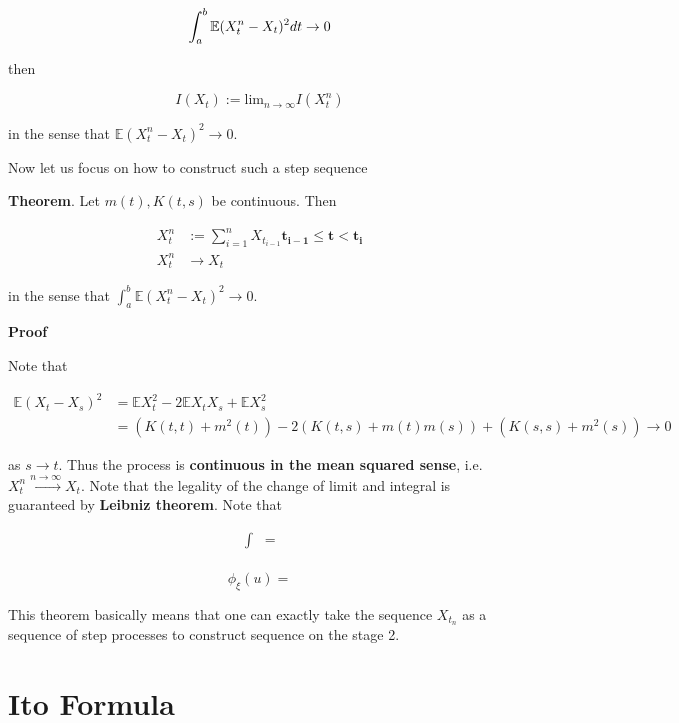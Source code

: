 \documentclass[12pt]{article}
\theoremstyle{nonumberbreak}
\begin{document}
$$
\int_a^b \mathbb{E} (X_t^n - X_t)^2 dt \to 0 \\[8pt]
$$

then

$$
I(X_t) := \mathrm{lim}_{n\to\infty} I(X_t^n) 
$$

in the sense that $\mathbb{E} (X_t^n - X_t)^2 \to 0$.

Now let us focus on how to construct such a step sequence 

\begin{theorem}
\textbf{Theorem}. Let $m(t), K(t,s)$ be continuous. Then 

$$
\begin{aligned}
X_t^n &:= \sum_{i=1}^n X_{t_{i-1}} \mathbf{t_{i-1} \le t < t_i} \\[8pt]
X_t^n &\to X_t
\end{aligned}
$$

in the sense that $\int_a^b \mathbb{E} (X_t^n - X_t)^2 \to 0$.
\end{theorem}

\textbf{Proof}

Note that 

$$
\begin{aligned}
\mathbb{E} (X_t - X_s)^2 &= \mathbb{E}X_t^2 - 2\mathbb{E}X_t X_s + \mathbb{E} X_s^2 \\[8pt]
&= \left(K(t,t) + m^2(t) \right) - 2 \left( K(t,s) + m(t)m(s) \right) + \left( K(s,s) + m^2(s) \right) \to 0
\end{aligned}
$$

as $s \to t$. Thus the process is \textbf{continuous in the mean squared sense}, i.e. $X_t^n \overset{ n\to\infty} {\to} X_t$. Note that the legality of the change of limit and integral is guaranteed by \textbf{Leibniz theorem}. Note that 

$$
\begin{aligned}
\int  &= \\[8pt]
\end{aligned}
$$

$$
\phi_\xi(u) = 
$$

This theorem basically means that one can exactly take the sequence $X_{t_n}$ as a sequence of step processes to construct sequence on the stage 2. 



\pagebreak
\section{Ito Formula}
\end{document}
